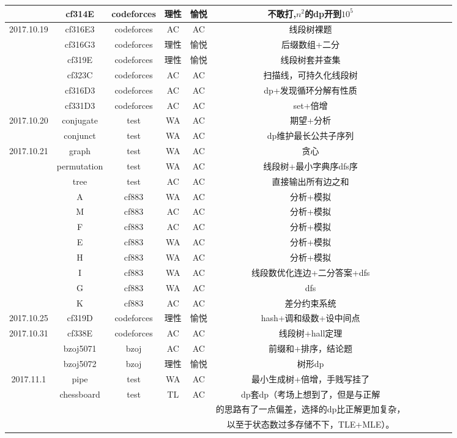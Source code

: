\documentclass[landscape]{article}
\begin{document}
\begin{longtable}{ccccccccccc}
  & cf314E & codeforces & 理性 & 愉悦 & 不敢打,$n^2$的dp开到$10^5$\\
  \hline
  2017.10.19 & cf316E3 & codeforces & AC & AC & 线段树裸题\\
  & cf316G3 & codeforces & 理性 & 愉悦 & 后缀数组+二分\\
  & cf319E & codeforces & 理性 & 愉悦 & 线段树套并查集\\
  & cf323C & codeforces & AC & AC & 扫描线，可持久化线段树\\
  & cf316D3 & codeforces & AC & AC & dp+发现循环分解有性质\\
  & cf331D3 & codeforces & AC & AC & set+倍增\\
  \hline
  2017.10.20 & conjugate & test & WA & AC & 期望+分析\\
  & conjunct & test & WA & AC & dp维护最长公共子序列\\
  \hline
  2017.10.21 & graph & test & WA & AC & 贪心\\
  & permutation & test & WA & AC & 线段树+最小字典序dfs序\\
  & tree & test & AC & AC & 直接输出所有边之和\\
  & A & cf883 & WA & AC & 分析+模拟\\
  & M & cf883 & AC & AC & 分析+模拟\\
  & F & cf883 & AC & AC & 分析+模拟\\
  & E & cf883 & WA & AC & 分析+模拟\\
  & H & cf883 & WA & AC & 分析+模拟\\
  & I & cf883 & WA & AC & 线段数优化连边+二分答案+dfs\\
  & G & cf883 & WA & AC & dfs\\
  & K & cf883 & AC & AC & 差分约束系统\\
  \hline
  2017.10.25 & cf319D & codeforces & 理性 & 愉悦 & hash+调和级数+设中间点\\
  \hline
  2017.10.31 & cf338E & codeforces & AC & AC & 线段树+hall定理\\
  & bzoj5071 & bzoj & AC & AC & 前缀和+排序，结论题\\
  & bzoj5072 & bzoj & 理性 & 愉悦 & 树形dp\\
  \hline
  2017.11.1 & pipe & test & WA & AC & 最小生成树+倍增，手贱写挂了\\
  & chessboard & test & TL & AC & dp套dp（考场上想到了，但是与正解\\
    & & & & & 的思路有了一点偏差，选择的dp比正解更加复杂，\\
    & & & & & 以至于状态数过多存储不下，TLE+MLE）。\\

\end{longtable}
\end{document}
